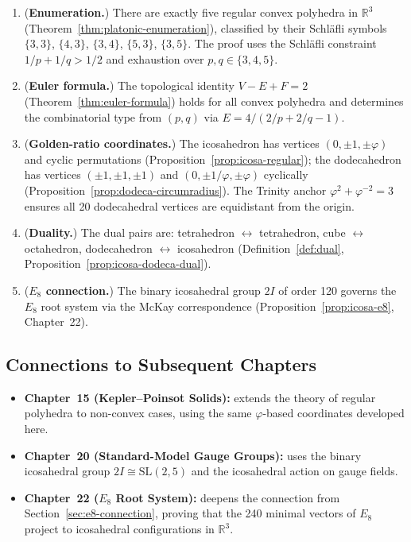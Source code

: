 \begin{enumerate}
  \item (\textbf{Enumeration.}) There are exactly five regular convex
        polyhedra in $\mathbb{R}^3$ (Theorem~\ref{thm:platonic-enumeration}),
        classified by their Schläfli symbols $\{3,3\}$, $\{4,3\}$, $\{3,4\}$,
        $\{5,3\}$, $\{3,5\}$.  The proof uses the Schläfli constraint
        $1/p + 1/q > 1/2$ and exhaustion over $p,q \in \{3,4,5\}$.

  \item (\textbf{Euler formula.}) The topological identity $V-E+F = 2$
        (Theorem~\ref{thm:euler-formula}) holds for all convex polyhedra
        and determines the combinatorial type from $(p,q)$ via
        $E = 4/(2/p+2/q-1)$.

  \item (\textbf{Golden-ratio coordinates.})  The icosahedron has vertices
        $(0,\pm 1,\pm\varphi)$ and cyclic permutations
        (Proposition~\ref{prop:icosa-regular}); the dodecahedron has vertices
        $(\pm 1,\pm 1,\pm 1)$ and $(0,\pm 1/\varphi,\pm\varphi)$ cyclically
        (Proposition~\ref{prop:dodeca-circumradius}).  The Trinity anchor
        $\varphi^2+\varphi^{-2}=3$ ensures all 20 dodecahedral vertices are
        equidistant from the origin.

  \item (\textbf{Duality.}) The dual pairs are: tetrahedron $\leftrightarrow$
        tetrahedron, cube $\leftrightarrow$ octahedron,
        dodecahedron $\leftrightarrow$ icosahedron
        (Definition~\ref{def:dual}, Proposition~\ref{prop:icosa-dodeca-dual}).

  \item (\textbf{$E_8$ connection.}) The binary icosahedral group $2I$ of
        order 120 governs the $E_8$ root system via the McKay correspondence
        (Proposition~\ref{prop:icosa-e8}, Chapter~22).
\end{enumerate}

\subsection{Connections to Subsequent Chapters}
\label{subsec:forward-links}

\begin{itemize}
  \item \textbf{Chapter~15 (Kepler–Poinsot Solids):} extends the theory of
        regular polyhedra to non-convex cases, using the same $\varphi$-based
        coordinates developed here.
  \item \textbf{Chapter~20 (Standard-Model Gauge Groups):} uses the binary
        icosahedral group $2I \cong \mathrm{SL}(2,5)$ and the icosahedral
        action on gauge fields.
  \item \textbf{Chapter~22 ($E_8$ Root System):} deepens the connection from
        Section~\ref{sec:e8-connection}, proving that the 240 minimal vectors
        of $E_8$ project to icosahedral configurations in $\mathbb{R}^3$.
\end{itemize}

